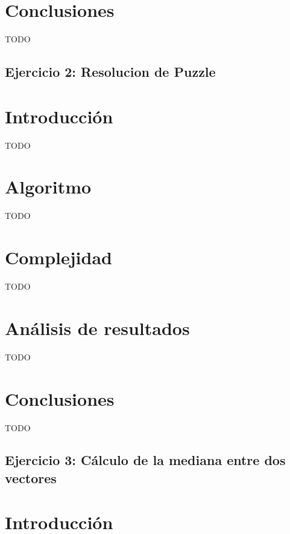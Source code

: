 \documentclass[a4paper,10pt] {article}
\begin{document}

\section*{Conclusiones}

TODO

\begin{center}
\section*{Ejercicio 2: Resolucion de Puzzle}
\end{center}

\bigskip
\section*{Introducci\'on}

TODO

\section*{Algoritmo}

TODO

\section*{Complejidad}

TODO

\section*{An\'alisis de resultados}

TODO

\section*{Conclusiones}

TODO

\begin{center}
\section*{Ejercicio 3: C\'alculo de la mediana entre dos vectores}
\end{center}

\bigskip
\section*{Introducci\'on}
\end{document}
